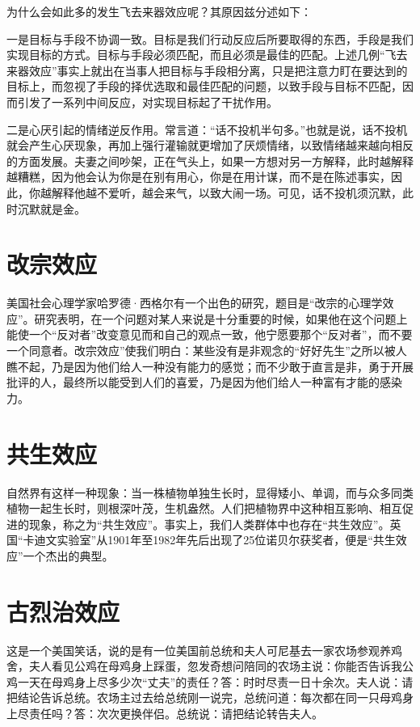 \documentclass[11pt]{ctexart}
\begin{document}
为什么会如此多的发生飞去来器效应呢？其原因兹分述如下：

一是目标与手段不协调一致。目标是我们行动反应后所要取得的东西，手段是我们实现目标的方式。目标与手段必须匹配，而且必须是最佳的匹配。上述几例“飞去来器效应”事实上就出在当事人把目标与手段相分离，只是把注意力盯在要达到的目标上，而忽视了手段的择优选取和最佳匹配的问题，以致手段与目标不匹配，因而引发了一系列中间反应，对实现目标起了干扰作用。

二是心厌引起的情绪逆反作用。常言道：“话不投机半句多。”也就是说，话不投机就会产生心厌现象，再加上强行灌输就更增加了厌烦情绪，以致情绪越来越向相反的方面发展。夫妻之间吵架，正在气头上，如果一方想对另一方解释，此时越解释越糟糕，因为他会认为你是在别有用心，你是在用计谋，而不是在陈述事实，因此，你越解释他越不爱听，越会来气，以致大闹一场。可见，话不投机须沉默，此时沉默就是金。
\section{改宗效应}
\label{sec-38}


美国社会心理学家哈罗德·西格尔有一个出色的研究，题目是“改宗的心理学效应”。研究表明，在一个问题对某人来说是十分重要的时候，如果他在这个问题上能使一个“反对者”改变意见而和自己的观点一致，他宁愿要那个“反对者”，而不要一个同意者。改宗效应”使我们明白：某些没有是非观念的“好好先生”之所以被人瞧不起，乃是因为他们给人一种没有能力的感觉；而不少敢于直言是非，勇于开展批评的人，最终所以能受到人们的喜爱，乃是因为他们给人一种富有才能的感染力。
\section{共生效应}
\label{sec-39}


自然界有这样一种现象：当一株植物单独生长时，显得矮小、单调，而与众多同类植物一起生长时，则根深叶茂，生机盎然。人们把植物界中这种相互影响、相互促进的现象，称之为“共生效应”。事实上，我们人类群体中也存在“共生效应”。英国“卡迪文实验室”从1901年至1982年先后出现了25位诺贝尔获奖者，便是“共生效应”一个杰出的典型。
\section{古烈治效应}
\label{sec-40}


这是一个美国笑话，说的是有一位美国前总统和夫人可尼基去一家农场参观养鸡舍，夫人看见公鸡在母鸡身上踩蛋，忽发奇想问陪同的农场主说：你能否告诉我公鸡一天在母鸡身上尽多少次“丈夫”的责任？答：时时尽责一日十余次。夫人说：请把结论告诉总统。农场主过去给总统刚一说完，总统问道：每次都在同一只母鸡身上尽责任吗？答：次次更换伴侣。总统说：请把结论转告夫人。
\end{document}
